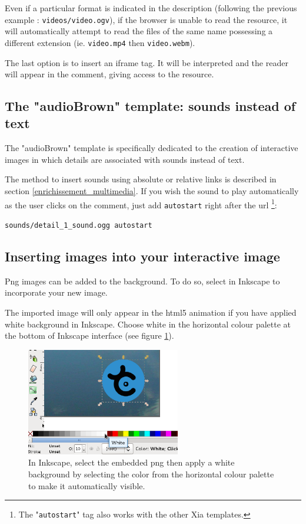 Even if a particular format is indicated in the description (following 
the previous example : \verb|videos/video.ogv|), if the browser is 
unable to read the resource, it will automatically attempt to read the files 
of the same name possessing a different extension (ie. \verb|video.mp4| 
then \verb|video.webm|).

The last option is to insert an iframe tag.
It will be interpreted and the reader will appear in the comment, 
giving access to the resource.

\subsection{The "audioBrown" template: sounds instead of text}\label{audioBrownsection}

The "audioBrown" template is specifically dedicated to the creation of 
interactive images in which details are associated with sounds instead of text.

The method to insert sounds using absolute or relative links is described in 
section 
\ref{enrichissement_multimedia}. If you wish the sound to play 
automatically as the user clicks on the comment, just add \verb|autostart| right 
after the url \footnote{The "\texttt{autostart}" tag also works with the other 
Xia templates.}:\\
\begin{center}
 \verb|sounds/detail_1_sound.ogg autostart|
\end{center}


\subsection{Inserting images into your interactive image}\label{insertion_images}

Png images can be added to the background. To do so, select  in 
Inkscape to incorporate your new image.

The imported image will only appear in the html5 animation if you have applied white background in 
Inkscape. Choose white in the horizontal colour palette at the bottom of 
Inkscape interface (see figure \ref{remplissage_blanc}).

\begin{figure}[htp!]
 \centering\includegraphics[width=0.6\textwidth] {images/remplissage_blanc}
 \caption[How to apply a white background to the details]{In Inkscape, select the embedded png then apply a white background 
 by selecting the color from the horizontal colour palette to make it 
 automatically visible.} 
 \label{remplissage_blanc}
\end{figure}

